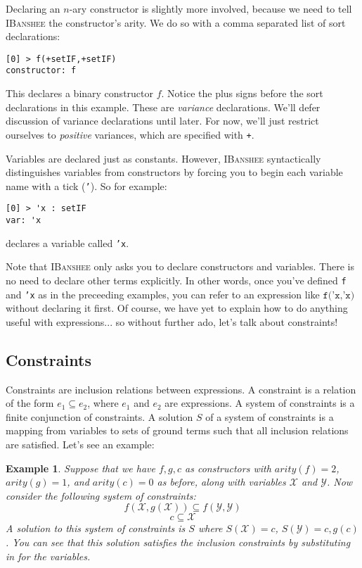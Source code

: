 \documentclass[10pt]{article}
\newcommand{\ibanshee}{\textsc{IBanshee}}
\newcommand{\var}[1]{\mathcal{#1}}
\newtheorem{example}{Example}
\begin{document}
Declaring an $n$-ary constructor is slightly more involved, because we
need to tell \ibanshee{} the constructor's arity. We do so with a
comma separated list of sort declarations:

\begin{verbatim}
[0] > f(+setIF,+setIF)
constructor: f
\end{verbatim}

This declares a binary constructor $f$. Notice the plus signs before
the sort declarations in this example. These are \emph{variance}
declarations. We'll defer discussion of variance declarations until
later. For now, we'll just restrict ourselves to \emph{positive}
variances, which are specified with \texttt{+}.

Variables are declared just as constants. However, \ibanshee{}
syntactically distinguishes variables from constructors by forcing you
to begin each variable name with a tick (\texttt{'}). So for example:

\begin{verbatim}
[0] > 'x : setIF
var: 'x
\end{verbatim}

declares a variable called \texttt{'x}.

Note that \ibanshee{} only asks you to declare constructors and
variables. There is no need to declare other terms explicitly. In
other words, once you've defined \texttt{f} and \texttt{'x} as in the
preceeding examples, you can refer to an expression like
$\texttt{f('x,'x)}$ without declaring it first. Of course, we have yet
to explain how to do anything useful with expressions... so without
further ado, let's talk about constraints!

\subsection{Constraints}

Constraints are inclusion relations between expressions. A constraint
is a relation of the form $e_1 \subseteq e_2$, where $e_1$ and $e_2$
are expressions. A system of constraints is a finite conjunction of
constraints. A solution $S$ of a system of constraints is a mapping
from variables to sets of ground terms such that all inclusion
relations are satisfied. Let's see an example:

\begin{example}
Suppose that we have $f,g,c$ as constructors with $arity(f) = 2$,
$arity(g) = 1$, and $arity(c) = 0$ as before, along with variables
$\var{X}$ and $\var{Y}$. Now consider the following system of
constraints:
\[
f(\var{X},g(\var{X})) \subseteq f(\var{Y},\var{Y})
\]
\[
c \subseteq \var{X}
\]
A solution to this system of constraints is $S$ where $S(\var{X}) =
{c}$, $S(\var{Y}) = {c,g(c)}$. You can see that this solution
satisfies the inclusion constraints by substituting in for the
variables.
\end{example}
\end{document}
